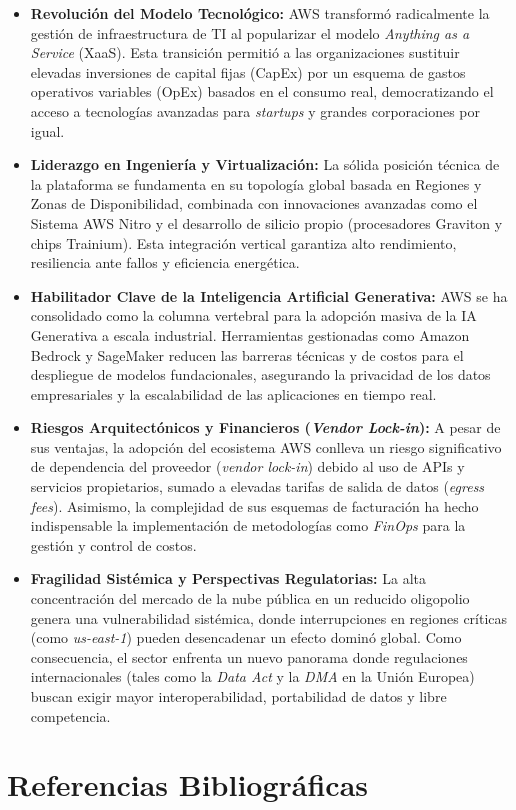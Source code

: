 \documentclass[12pt,a4paper]{article}
\begin{document}
\begin{itemize}
    \item \textbf{Revolución del Modelo Tecnológico:} AWS transformó radicalmente la gestión de infraestructura de TI al popularizar el modelo \textit{Anything as a Service} (XaaS). Esta transición permitió a las organizaciones sustituir elevadas inversiones de capital fijas (CapEx) por un esquema de gastos operativos variables (OpEx) basados en el consumo real, democratizando el acceso a tecnologías avanzadas para \textit{startups} y grandes corporaciones por igual.
    
    \item \textbf{Liderazgo en Ingeniería y Virtualización:} La sólida posición técnica de la plataforma se fundamenta en su topología global basada en Regiones y Zonas de Disponibilidad, combinada con innovaciones avanzadas como el Sistema AWS Nitro y el desarrollo de silicio propio (procesadores Graviton y chips Trainium). Esta integración vertical garantiza alto rendimiento, resiliencia ante fallos y eficiencia energética.
    
    \item \textbf{Habilitador Clave de la Inteligencia Artificial Generativa:} AWS se ha consolidado como la columna vertebral para la adopción masiva de la IA Generativa a escala industrial. Herramientas gestionadas como Amazon Bedrock y SageMaker reducen las barreras técnicas y de costos para el despliegue de modelos fundacionales, asegurando la privacidad de los datos empresariales y la escalabilidad de las aplicaciones en tiempo real.
    
    \item \textbf{Riesgos Arquitectónicos y Financieros (\textit{Vendor Lock-in}):} A pesar de sus ventajas, la adopción del ecosistema AWS conlleva un riesgo significativo de dependencia del proveedor (\textit{vendor lock-in}) debido al uso de APIs y servicios propietarios, sumado a elevadas tarifas de salida de datos (\textit{egress fees}). Asimismo, la complejidad de sus esquemas de facturación ha hecho indispensable la implementación de metodologías como \textit{FinOps} para la gestión y control de costos.
    
    \item \textbf{Fragilidad Sistémica y Perspectivas Regulatorias:} La alta concentración del mercado de la nube pública en un reducido oligopolio genera una vulnerabilidad sistémica, donde interrupciones en regiones críticas (como \textit{us-east-1}) pueden desencadenar un efecto dominó global. Como consecuencia, el sector enfrenta un nuevo panorama donde regulaciones internacionales (tales como la \textit{Data Act} y la \textit{DMA} en la Unión Europea) buscan exigir mayor interoperabilidad, portabilidad de datos y libre competencia.
\end{itemize}

\newpage

\section{Referencias Bibliográficas}
\nocite{*} %
\printbibliography[heading=none]
\newpage
\end{document}
